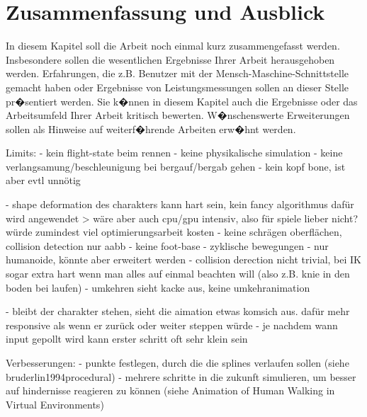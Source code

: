 \chapter{Zusammenfassung und Ausblick}

In diesem Kapitel soll die Arbeit noch einmal kurz zusammengefasst werden. Insbesondere sollen die wesentlichen Ergebnisse Ihrer Arbeit herausgehoben werden. Erfahrungen, die z.B. Benutzer mit der Mensch-Maschine-Schnittstelle gemacht haben oder Ergebnisse von Leistungsmessungen sollen an dieser Stelle pr�sentiert werden. Sie k�nnen in diesem Kapitel auch die Ergebnisse oder das Arbeitsumfeld Ihrer Arbeit kritisch bewerten. W�nschenswerte Erweiterungen sollen als Hinweise auf weiterf�hrende Arbeiten erw�hnt werden.



Limits:
- kein flight-state beim rennen
- keine physikalische simulation
- keine verlangsamung/beschleunigung bei bergauf/bergab gehen
- kein kopf bone, ist aber evtl unnötig

- shape deformation des charakters kann hart sein, kein fancy algorithmus dafür wird angewendet
> wäre aber auch cpu/gpu intensiv, also für spiele lieber nicht? würde zumindest viel optimierungsarbeit kosten
- keine schrägen oberflächen, collision detection nur aabb
- keine foot-base
- zyklische bewegungen
- nur humanoide, könnte aber erweitert werden
- collision derection nicht trivial, bei IK sogar extra hart wenn man alles auf einmal beachten will (also z.B. knie in den boden bei laufen)
- umkehren sieht kacke aus, keine umkehranimation

- bleibt der charakter stehen, sieht die aimation etwas komsich aus. dafür mehr responsive als wenn er zurück oder weiter steppen würde
- je nachdem wann input gepollt wird kann erster schritt oft sehr klein sein

Verbesserungen:
- punkte festlegen, durch die die splines verlaufen sollen (siehe bruderlin1994procedural)
- mehrere schritte in die zukunft simulieren, um besser auf hindernisse reagieren zu können (siehe Animation of Human Walking in Virtual Environments)